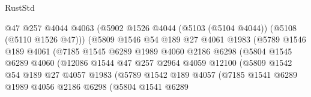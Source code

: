 \begin{lexlean}{RustStd}
\begin{coremodule}
                                @47
                                @257
                                @4044
                                @4063
                                (@5902 @1526 @4044 (@5103 (@5104 @4044)) (@5108 (@5110 @1526 @47)))
                                (@5809
                                  @1546
                                  @54
                                  @189
                                  @27
                                  @4061
                                  @1983
                                  (@5789
                                    @1546
                                    @189
                                    @4061
                                    (@7185
                                      @1545
                                      @6289
                                      @1989
                                      @4060
                                      @2186
                                      @6298
                                      (@5804
                                        @1545
                                        @6289
                                        @4060
                                        (@12086
                                          @1544
                                          @47
                                          @257
                                          @2964
                                          @4059
                                          @12100
                                          (@5809
                                            @1542
                                            @54
                                            @189
                                            @27
                                            @4057
                                            @1983
                                            (@5789
                                              @1542
                                              @189
                                              @4057
                                              (@7185
                                                @1541
                                                @6289
                                                @1989
                                                @4056
                                                @2186
                                                @6298
                                                (@5804
                                                  @1541
                                                  @6289

\end{coremodule}
\end{lexlean}
